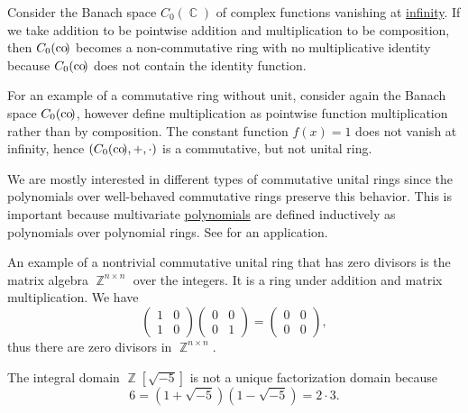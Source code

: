 \begin{example}
\begin{refenum}
     Consider the Banach space \( C_0(\BbbC) \) of complex functions vanishing at \hyperref[def:function_spaces/c0]{infinity}. If we take addition to be pointwise addition and multiplication to be composition, then \( C_0(\operatorname*{co\negthinspace)} \) becomes a non-commutative ring with no multiplicative identity because \( C_0(\operatorname*{co\negthinspace)} \) does not contain the identity function.

     For an example of a commutative ring without unit, consider again the Banach space \( C_0(\operatorname*{co\negthinspace)} \), however define multiplication as pointwise function multiplication rather than by composition. The constant function \( f(x) = 1 \) does not vanish at infinity, hence \( (C_0(\operatorname*{co\negthinspace)}, +, \cdot) \) is a commutative, but not unital ring.

     We are mostly interested in different types of commutative unital rings since the polynomials over well-behaved commutative rings preserve this behavior. This is important because multivariate \hyperref[def:multivariate_polynomial]{polynomials} are defined inductively as polynomials over polynomial rings. See  for an application.

    An example of a nontrivial commutative unital ring that has zero divisors is the matrix algebra \( \BbbZ^{n \times n} \) over the integers. It is a ring under addition and matrix multiplication. We have
    \begin{equation*}
      \begin{pmatrix}
        1 & 0 \\
        1 & 0
      \end{pmatrix}
      \begin{pmatrix}
        0 & 0 \\
        0 & 1
      \end{pmatrix}
      =
      \begin{pmatrix}
        0 & 0 \\
        0 & 0
      \end{pmatrix},
    \end{equation*}
    thus there are zero divisors in \( \BbbZ^{n \times n} \).

    \cite[388]{Knapp2016BasicAlgebra} The integral domain \( \BbbZ[\sqrt{-5}] \) is not a unique factorization domain because
    \begin{equation*}
      6 = (1 + \sqrt{-5}) (1 - \sqrt{-5}) = 2 \cdot 3.
    \end{equation*}


\end{refenum}
\end{example}
